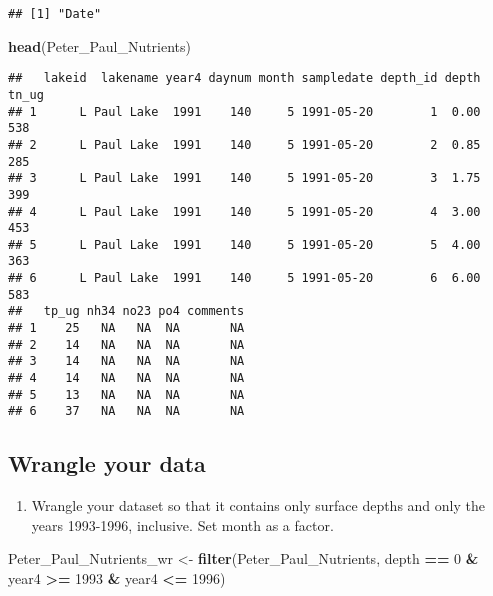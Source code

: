 \documentclass[]{article}
\newenvironment{Shaded}{\begin{snugshade}}{\end{snugshade}}
\newcommand{\DecValTok}[1]{\textcolor[rgb]{0.00,0.00,0.81}{#1}}
\newcommand{\KeywordTok}[1]{\textcolor[rgb]{0.13,0.29,0.53}{\textbf{#1}}}
\newcommand{\NormalTok}[1]{#1}
\newcommand{\OperatorTok}[1]{\textcolor[rgb]{0.81,0.36,0.00}{\textbf{#1}}}
\newcommand{\StringTok}[1]{\textcolor[rgb]{0.31,0.60,0.02}{#1}}
\providecommand{\tightlist}{%
  \setlength{\itemsep}{0pt}\setlength{\parskip}{0pt}}
\begin{document}
\begin{verbatim}
## [1] "Date"
\end{verbatim}

\begin{Shaded}
\begin{Highlighting}[]
\KeywordTok{head}\NormalTok{(Peter_Paul_Nutrients)}
\end{Highlighting}
\end{Shaded}

\begin{verbatim}
##   lakeid  lakename year4 daynum month sampledate depth_id depth tn_ug
## 1      L Paul Lake  1991    140     5 1991-05-20        1  0.00   538
## 2      L Paul Lake  1991    140     5 1991-05-20        2  0.85   285
## 3      L Paul Lake  1991    140     5 1991-05-20        3  1.75   399
## 4      L Paul Lake  1991    140     5 1991-05-20        4  3.00   453
## 5      L Paul Lake  1991    140     5 1991-05-20        5  4.00   363
## 6      L Paul Lake  1991    140     5 1991-05-20        6  6.00   583
##   tp_ug nh34 no23 po4 comments
## 1    25   NA   NA  NA       NA
## 2    14   NA   NA  NA       NA
## 3    14   NA   NA  NA       NA
## 4    14   NA   NA  NA       NA
## 5    13   NA   NA  NA       NA
## 6    37   NA   NA  NA       NA
\end{verbatim}

\hypertarget{wrangle-your-data}{%
\subsection{Wrangle your data}\label{wrangle-your-data}}

\begin{enumerate}
\def\labelenumi{\arabic{enumi}.}
\setcounter{enumi}{2}
\tightlist
\item
  Wrangle your dataset so that it contains only surface depths and only
  the years 1993-1996, inclusive. Set month as a factor.
\end{enumerate}

\begin{Shaded}
\begin{Highlighting}[]
\NormalTok{Peter_Paul_Nutrients_wr <-}\StringTok{ }
\StringTok{  }\KeywordTok{filter}\NormalTok{(Peter_Paul_Nutrients, }
\NormalTok{         depth }\OperatorTok{==}\StringTok{ }\DecValTok{0} \OperatorTok{&}\StringTok{ }
\StringTok{           }\NormalTok{year4 }\OperatorTok{>=}\StringTok{ }\DecValTok{1993} \OperatorTok{&}\StringTok{ }
\StringTok{           }\NormalTok{year4 }\OperatorTok{<=}\StringTok{ }\DecValTok{1996}\NormalTok{)}
\end{Highlighting}
\end{Shaded}
\end{document}

